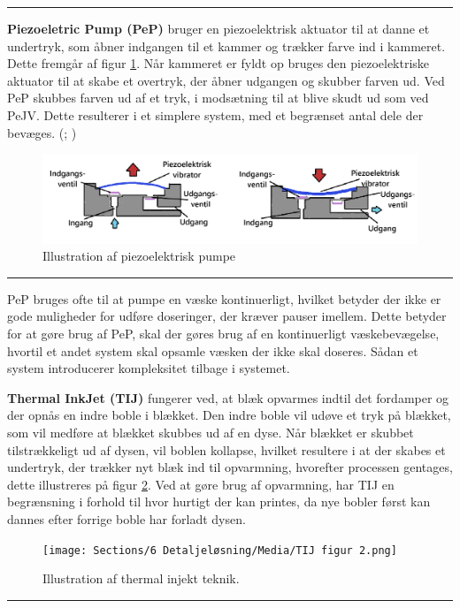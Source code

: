 \plainbreak{1}
\textbf{Piezoeletric Pump (PeP)} bruger en piezoelektrisk aktuator til at danne et undertryk, som åbner indgangen til et kammer og trækker farve ind i kammeret. Dette fremgår af figur \ref{fig:PeMP}. Når kammeret er fyldt op bruges den piezoelektriske aktuator til at skabe et overtryk, der åbner udgangen og skubber farven ud. Ved PeP skubbes farven ud af et tryk, i modsætning til at blive skudt ud som ved PeJV. Dette resulterer i et simplere system, med et begrænset antal dele der bevæges. (\cite{Benaissa2012PerformancesPiezo-pump}; \cite{Hoath2016FundamentalsDroplets})

\begin{figure}[H]
    \centering
    \includegraphics[width=1\linewidth]{Sections/5 Konceptgenerering/Media/pumpe.png}
    \caption{Illustration af piezoelektrisk pumpe}
    \label{fig:PeMP}
\end{figure} \plainbreak{-0.5}

PeP bruges ofte til at pumpe en væske kontinuerligt, hvilket betyder der ikke er gode muligheder for udføre doseringer, der kræver pauser imellem. Dette betyder for at gøre brug af PeP, skal der gøres brug af en kontinuerligt væskebevægelse, hvortil et andet system skal opsamle væsken der ikke skal doseres. Sådan et system introducerer kompleksitet tilbage i systemet.

\textbf{Thermal InkJet (TIJ)} fungerer ved, at blæk opvarmes indtil det fordamper og der opnås en indre boble i blækket. Den indre boble vil udøve et tryk på blækket, som vil medføre at blækket skubbes ud af en dyse. Når blækket er skubbet tilstrækkeligt ud af dysen, vil boblen kollapse, hvilket resultere i at der skabes et undertryk, der trækker nyt blæk ind til opvarmning, hvorefter processen gentages, dette illustreres på figur \ref{fig:TIJ figur}. 
Ved at gøre brug af opvarmning, har TIJ en begrænsning i forhold til hvor hurtigt der kan printes, da nye bobler først kan dannes efter forrige boble har forladt dysen. \parencite{Hoath2016FundamentalsDroplets}


\begin{figure}[H]
    \centering
    \texttt{[image: Sections/6 Detaljeløsning/Media/TIJ figur 2.png]}
    \caption{Illustration af thermal injekt teknik.}
    \label{fig:TIJ figur}
\end{figure} \plainbreak{-.5}

